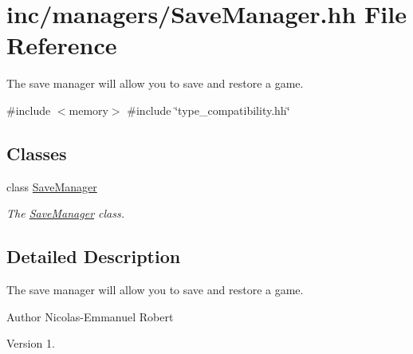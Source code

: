 \hypertarget{SaveManager_8hh}{}\section{inc/managers/\+Save\+Manager.hh File Reference}
\label{SaveManager_8hh}


The save manager will allow you to save and restore a game.  


{\ttfamily \#include $<$memory$>$}\newline
{\ttfamily \#include \char`\"{}type\+\_\+compatibility.\+hh\char`\"{}}\newline
\subsection*{Classes}
\begin{DoxyCompactItemize}
\item 
class \hyperlink{classSaveManager}{Save\+Manager}
\begin{DoxyCompactList}\small\item\em The \hyperlink{classSaveManager}{Save\+Manager} class. \end{DoxyCompactList}\end{DoxyCompactItemize}


\subsection{Detailed Description}
The save manager will allow you to save and restore a game. 

\begin{DoxyAuthor}{Author}
Nicolas-\/\+Emmanuel Robert 
\end{DoxyAuthor}
\begin{DoxyVersion}{Version}
1. 
\end{DoxyVersion}
